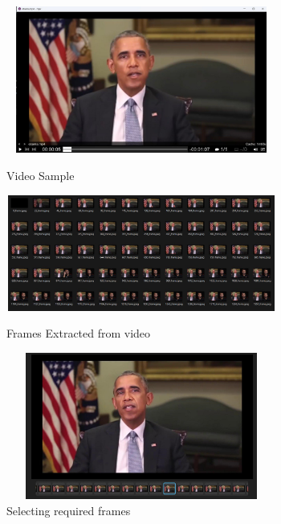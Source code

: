 \begin{figure}[ht]
    \begin{minipage}{0.9\linewidth}
      \centering
      \includegraphics[width= 3.5in,height=1.9in ]{img/framesExtracted.jpg}
      \caption{Video Sample}
      
    \end{minipage}
    
    \vspace{.5cm} %
  
    \begin{minipage}{0.9\linewidth}
      \centering
      \includegraphics[width= 3.5in, height=1.5in ]{img/frames.jpg}
    \caption{Frames Extracted from video}
     
    \end{minipage}
    
    \vspace{.5cm} %
  
    \begin{minipage}{0.9\linewidth}
      \centering
      \includegraphics[width= 3.5in,height=1.9in ]{img/frameSelected.jpg}
      \caption{Selecting required frames}
    \end{minipage}
    
  \end{figure}
